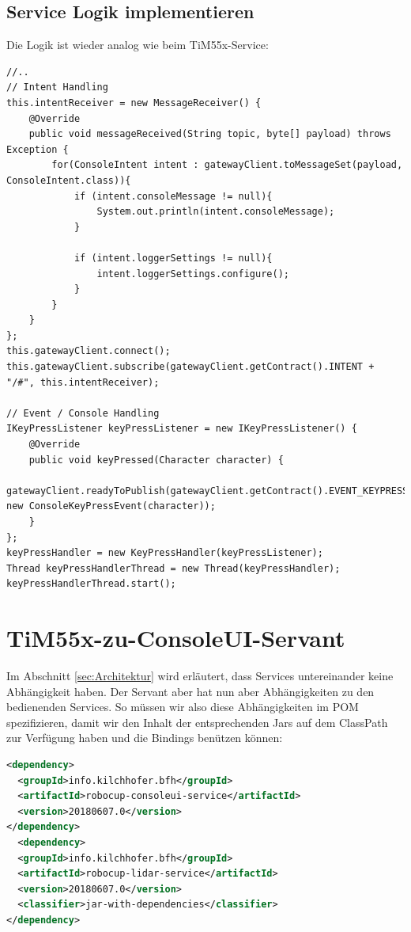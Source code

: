 \subsection{Service Logik implementieren}
Die Logik ist wieder analog wie beim TiM55x-Service:
\begin{lstlisting}
//..
// Intent Handling
this.intentReceiver = new MessageReceiver() {
    @Override
    public void messageReceived(String topic, byte[] payload) throws Exception {
        for(ConsoleIntent intent : gatewayClient.toMessageSet(payload, ConsoleIntent.class)){
            if (intent.consoleMessage != null){
                System.out.println(intent.consoleMessage);
            }

            if (intent.loggerSettings != null){
                intent.loggerSettings.configure();
            }
        }
    }
};
this.gatewayClient.connect();
this.gatewayClient.subscribe(gatewayClient.getContract().INTENT + "/#", this.intentReceiver);

// Event / Console Handling
IKeyPressListener keyPressListener = new IKeyPressListener() {
    @Override
    public void keyPressed(Character character) {
        gatewayClient.readyToPublish(gatewayClient.getContract().EVENT_KEYPRESS, new ConsoleKeyPressEvent(character));
    }
};
keyPressHandler = new KeyPressHandler(keyPressListener);
Thread keyPressHandlerThread = new Thread(keyPressHandler);
keyPressHandlerThread.start();
\end{lstlisting}

\section{TiM55x-zu-ConsoleUI-Servant}
Im Abschnitt \ref{sec:Architektur} wird erläutert, dass Services untereinander keine Abhängigkeit haben. Der Servant aber hat nun aber Abhängigkeiten zu den bedienenden Services. So müssen wir also diese Abhängigkeiten im POM spezifizieren, damit wir den Inhalt der entsprechenden Jars auf dem ClassPath zur Verfügung haben und die Bindings benützen können:
\begin{lstlisting}[caption={Dependencies vom TiM55x-zu-UI-Servant},label={},language={XML}]
<dependency>
  <groupId>info.kilchhofer.bfh</groupId>
  <artifactId>robocup-consoleui-service</artifactId>
  <version>20180607.0</version>
</dependency>
  <dependency>
  <groupId>info.kilchhofer.bfh</groupId>
  <artifactId>robocup-lidar-service</artifactId>
  <version>20180607.0</version>
  <classifier>jar-with-dependencies</classifier>
</dependency>
\end{lstlisting}

